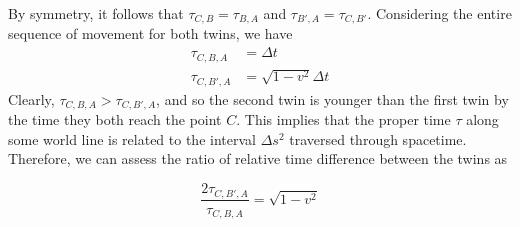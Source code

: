 \documentclass{article}
\begin{document}
\begin{exmp}
 			By symmetry, it follows that $\tau_{C,B} = \tau_{B,A}$ and $\tau_{B', A} = \tau_{C, B'}$. Considering the entire sequence of movement for both twins, we have
 			\begin{align*}
 				\tau_{C,B,A} &= \Delta t \\
 				\tau_{C,B',A} &= \sqrt{1 - v^2} \Delta t
 			\end{align*}
 			Clearly, $\tau_{C,B,A} > \tau_{C,B',A}$, and so the second twin is younger than the first twin by the time they both reach the point $C$. This implies that the proper time $\tau$ along some world line is related to the interval $\Delta s^2$ traversed through spacetime. Therefore, we can assess the ratio of relative time difference between the twins as 
 			
 			$$ \frac{2 \tau_{C,B',A}}{\tau_{C,B,A}} = \sqrt{1-v^2} $$
 		\end{exmp}
 	\pagebreak
\end{document}
